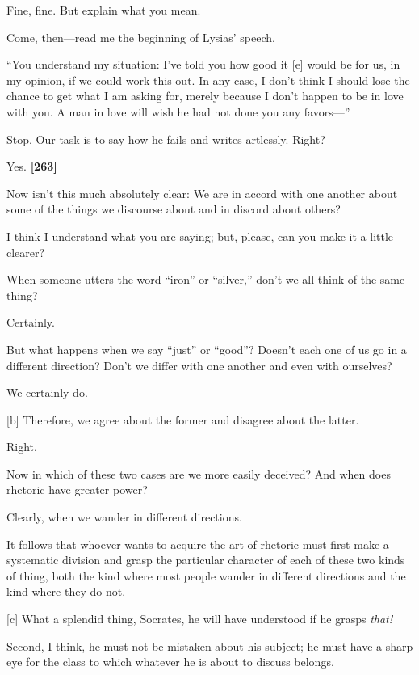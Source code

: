 \sayphaedrus Fine, fine. But explain what you mean.

\saysocrates Come, then---read me the beginning of Lysias' speech.

\sayphaedrus “You understand my situation: I've told you how good it
{[}e{]} would be for us, in my opinion, if we could work this out. In
any case, I don't think I should lose the chance to get what I am asking
for, merely because I don't happen to be in love with you. A man in love
will wish he had not done you any favors---”

\saysocrates Stop. Our task is to say how he fails and writes artlessly.
Right?

\sayphaedrus Yes. {\bf {[}263{]}}

\saysocrates Now isn't this much absolutely clear: We are in accord with
one another about some of the things we discourse about and in discord
about others?

\sayphaedrus I think I understand what you are saying; but, please, can you
make it a little clearer?

\saysocrates When someone utters the word “iron” or “silver,” don't we all
think of the same thing?

\sayphaedrus Certainly.

\saysocrates But what happens when we say “just” or “good”? Doesn't each
one of us go in a different direction? Don't we differ with one another
and even with ourselves?

\sayphaedrus We certainly do.

{[}b{]} \saysocrates Therefore, we agree about the former and disagree
about the latter.

\sayphaedrus Right.

\saysocrates Now in which of these two cases are we more easily deceived?
And when does rhetoric have greater power?

\sayphaedrus Clearly, when we wander in different directions.

\saysocrates It follows that whoever wants to acquire the art of rhetoric
must first make a systematic division and grasp the particular character
of each of these two kinds of thing, both the kind where most people
wander in different directions and the kind where they do not.

{[}c{]} \sayphaedrus What a splendid thing, Socrates, he will have
understood if he grasps {\em that!}

\saysocrates Second, I think, he must not be mistaken about his subject; he
must have a sharp eye for the class to which whatever he is about to
discuss belongs.

